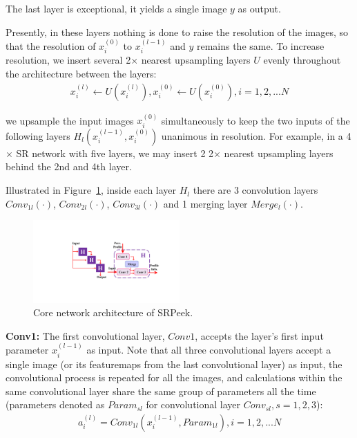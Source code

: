 The last layer is exceptional, it yields a single image $y$ as output. 

Presently, in these layers nothing is done to raise the resolution of the images, so that the resolution of $x_i^{(0)}$ to $x_i^{(l-1)}$ and $y$ remains the same. To increase resolution, we insert several 2$\times$ nearest upsampling layers $U$ evenly throughout the architecture between the layers:
\begin{equation}\label{eq:3}
    \begin{split}
        x_i^{(l)} \leftarrow U(x_i^{(l)}), x_i^{(0)} \leftarrow U(x_i^{(0)}), i=1,2,...N
\end{split}
\end{equation}

we upsample the input images $x_i^{(0)}$ simultaneously to keep the two inputs of the following layers $H_l(x_i^{(l-1)},x_i^{(0)})$ unanimous in resolution. For example, in a 4$\times$ SR network with five layers, we may insert 2 2$\times$ nearest upsampling layers behind the 2nd and 4th layer.

Illustrated in Figure~\ref{fig-system}, inside each layer $H_l$ there are 3 convolution layers $Conv_{1l}(\cdot)$, $Conv_{2l}(\cdot)$, $Conv_{3l}(\cdot)$ and 1 merging layer $Merge_l(\cdot)$.

\begin{figure}
    \centering
       \includegraphics[width=0.5\textwidth]{./pic/network.pdf}
       \caption{Core network architecture of SRPeek.}
       \label{fig-system}
   \end{figure}   

\vspace{1mm}
\noindent
\textbf{Conv1:} The first convolutional layer, $Conv1$, accepts the layer's first input parameter $x_i^{(l-1)}$ as input. Note that all three convolutional layers accept a single image (or its featuremaps from the last convolutional layer) as input, the convolutional process is repeated for all the images, and calculations within the same convolutional layer share the same group of parameters all the time (parameters denoted as $Param_{sl}$ for convolutional layer $Conv_{sl}, s=1,2,3$):
\begin{equation}\label{eq:4}
    \begin{split}
        a_i^{(l)} = Conv_{1l}(x_i^{(l-1)},Param_{1l}), i=1,2,...N
\end{split}
\end{equation}

